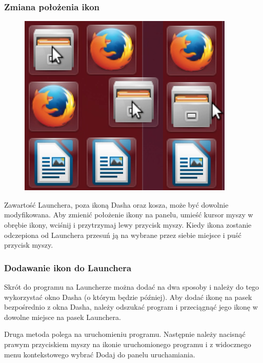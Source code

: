 \subsubsection{Zmiana położenia ikon}
\begin{figure}
                \includegraphics[width=\linewidth]{images/unity_launcher_zmiana_polozenia_ikon.png}
\end{figure}

Zawartość Launchera, poza ikoną Dasha oraz kosza, może być dowolnie modyfikowana. Aby zmienić położenie ikony na panelu, umieść kursor myszy w obrębie ikony, wciśnij i przytrzymaj lewy przycisk myszy. Kiedy ikona zostanie odczepiona od Launchera przesuń ją na wybrane przez siebie miejsce i puść przycisk myszy.

\subsubsection{Dodawanie ikon do Launchera}
Skrót do programu na Launcherze można dodać na dwa sposoby i należy do tego wykorzystać okno Dasha (o którym będzie później). Aby dodać ikonę na pasek bezpośrednio z okna Dasha, należy odszukać program i przeciągnąć jego ikonę w dowolne miejsce na pasek Launchera.

Druga metoda polega na uruchomieniu programu. Następnie należy nacisnąć prawym przyciskiem myszy na ikonie uruchomionego programu i z widocznego menu kontekstowego wybrać \textcolor{ubuntu_orange}{Dodaj do panelu uruchamiania}.

